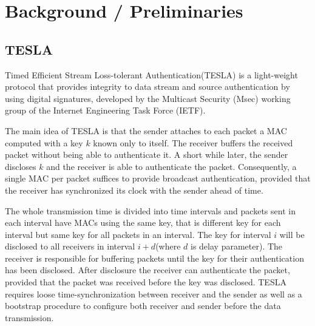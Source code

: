 \chapter{Background / Preliminaries }
\label{Preliminaries}



\section{TESLA}
Timed Efficient Stream Loss-tolerant Authentication(TESLA) is a light-weight protocol that provides integrity to data stream and source authentication by using digital signatures, developed by the Multicast Security (Msec) working group of the Internet Engineering Task Force (IETF). 

The main idea of TESLA is that the sender attaches to each packet a MAC computed with a key \(k\) known only to itself. The receiver buffers the received packet without being able to authenticate it. A short while later, the sender discloses \(k\) and the receiver is able to authenticate the packet. Consequently, a single MAC per packet suffices to provide broadcast authentication, provided that the receiver has synchronized its clock with the sender ahead of time.


The whole transmission time is divided into
time intervals and packets sent in each interval have MACs using the same key, that is different key for each interval but same key for all packets in an interval. The key for interval $i$ will be disclosed to all receivers in interval $i+d$(where $d$ is delay parameter). The receiver is responsible for buffering packets until the key for their authentication has been disclosed. After disclosure the receiver can authenticate the packet, provided that the packet was received before the key was disclosed. TESLA requires loose time-synchronization between receiver and the sender as well as a bootstrap procedure to configure both receiver and sender before the data transmission.

